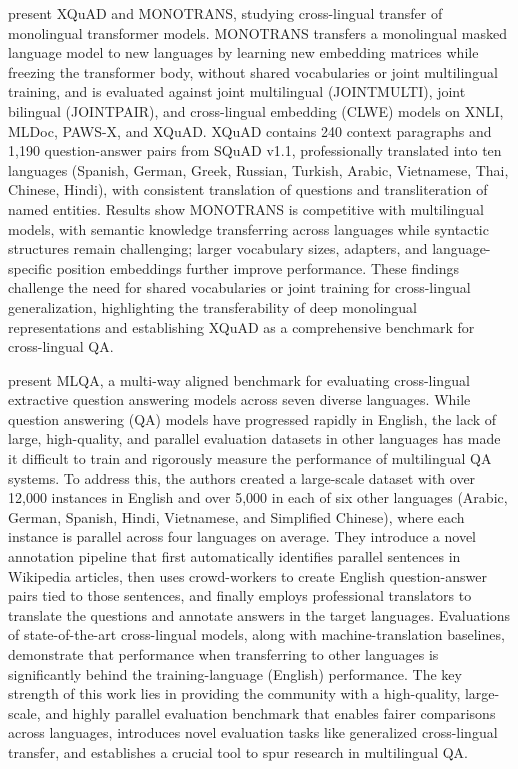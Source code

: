 \documentclass[acmsmall]{acmart}
\begin{document}
\citep{Artetxe_2020} present XQuAD and MONOTRANS, studying cross-lingual transfer of monolingual transformer models. MONOTRANS transfers a monolingual masked language model to new languages by learning new embedding matrices while freezing the transformer body, without shared vocabularies or joint multilingual training, and is evaluated against joint multilingual (JOINTMULTI), joint bilingual (JOINTPAIR), and cross-lingual embedding (CLWE) models on XNLI, MLDoc, PAWS-X, and XQuAD. XQuAD contains 240 context paragraphs and 1,190 question-answer pairs from SQuAD v1.1, professionally translated into ten languages (Spanish, German, Greek, Russian, Turkish, Arabic, Vietnamese, Thai, Chinese, Hindi), with consistent translation of questions and transliteration of named entities. Results show MONOTRANS is competitive with multilingual models, with semantic knowledge transferring across languages while syntactic structures remain challenging; larger vocabulary sizes, adapters, and language-specific position embeddings further improve performance. These findings challenge the need for shared vocabularies or joint training for cross-lingual generalization, highlighting the transferability of deep monolingual representations and establishing XQuAD as a comprehensive benchmark for cross-lingual QA.

\citep{lewis2019mlqa} present MLQA, a multi-way aligned benchmark for evaluating cross-lingual extractive question answering models across seven diverse languages. While question answering (QA) models have progressed rapidly in English, the lack of large, high-quality, and parallel evaluation datasets in other languages has made it difficult to train and rigorously measure the performance of multilingual QA systems. To address this, the authors created a large-scale dataset with over 12,000 instances in English and over 5,000 in each of six other languages (Arabic, German, Spanish, Hindi, Vietnamese, and Simplified Chinese), where each instance is parallel across four languages on average. They introduce a novel annotation pipeline that first automatically identifies parallel sentences in Wikipedia articles, then uses crowd-workers to create English question-answer pairs tied to those sentences, and finally employs professional translators to translate the questions and annotate answers in the target languages. Evaluations of state-of-the-art cross-lingual models, along with machine-translation baselines, demonstrate that performance when transferring to other languages is significantly behind the training-language (English) performance. The key strength of this work lies in providing the community with a high-quality, large-scale, and highly parallel evaluation benchmark that enables fairer comparisons across languages, introduces novel evaluation tasks like generalized cross-lingual transfer, and establishes a crucial tool to spur research in multilingual QA.
\end{document}
